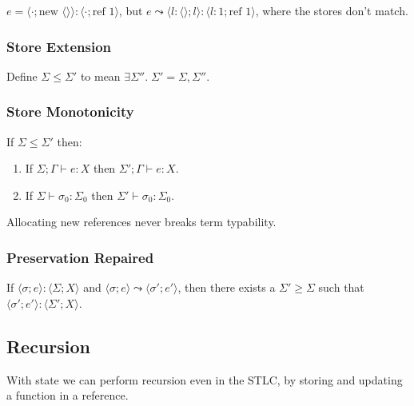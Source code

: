 \documentclass[a4paper,11pt]{article}
\begin{document}
{{        \(e = \langle\cdot;\text{new }\langle\rangle\rangle : \langle\cdot;\text{ref }1\rangle\), but \(e\leadsto
        \langle l:\langle\rangle;l\rangle : \langle l:1;\text{ref }1\rangle\), where the stores don't match.

        \subsubsection*{Store Extension}
        {
            Define \(\Sigma \leq \Sigma'\) to mean \(\exists\Sigma''.\; \Sigma'=\Sigma,\Sigma''\).
        }
        \subsubsection*{Store Monotonicity}
        {
            If \(\Sigma\leq\Sigma'\) then:
            \begin{enumerate}
            \item If \(\Sigma;\Gamma\vdash e : X\) then \(\Sigma';\Gamma\vdash e : X\).
            \item If \(\Sigma\vdash \sigma_0 : \Sigma_0\) then \(\Sigma'\vdash \sigma_0 : \Sigma_0\).
            \end{enumerate}

            Allocating new references never breaks term typability.
        }
        \subsubsection*{Preservation Repaired}
        {

            If \(\langle\sigma;e\rangle : \langle\Sigma;X\rangle\) and
            \(\langle\sigma;e\rangle\leadsto\langle\sigma';e'\rangle\), then there exists a \(\Sigma'\geq\Sigma\) such
            that \(\langle\sigma';e'\rangle : \langle\Sigma';X\rangle\).

        }
    }
    \subsection*{Recursion}
    {

        With state we can perform recursion even in the STLC, by storing and updating a function in a reference.

    }
}
\end{document}
